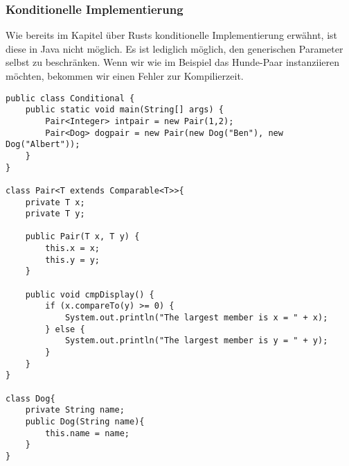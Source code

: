 \documentclass[a4paper, 1ppt]{article}
\begin{document}
\subsubsection{Konditionelle Implementierung}
Wie bereits im Kapitel über Rusts konditionelle Implementierung erwähnt, ist diese in Java nicht möglich.
Es ist lediglich möglich, den generischen Parameter selbst zu beschränken.
Wenn wir wie im Beispiel das Hunde-Paar instanziieren möchten, bekommen wir einen Fehler zur Kompilierzeit.
\begin{verbatim}
public class Conditional {
    public static void main(String[] args) {
        Pair<Integer> intpair = new Pair(1,2);
        Pair<Dog> dogpair = new Pair(new Dog("Ben"), new Dog("Albert"));
    }    
}

class Pair<T extends Comparable<T>>{
    private T x;
    private T y;

    public Pair(T x, T y) {
        this.x = x;
        this.y = y;
    }

    public void cmpDisplay() {
        if (x.compareTo(y) >= 0) {
            System.out.println("The largest member is x = " + x);
        } else {
            System.out.println("The largest member is y = " + y);
        }
    }
}

class Dog{
    private String name;
    public Dog(String name){
        this.name = name;
    }
}
\end{verbatim}
\end{document}
